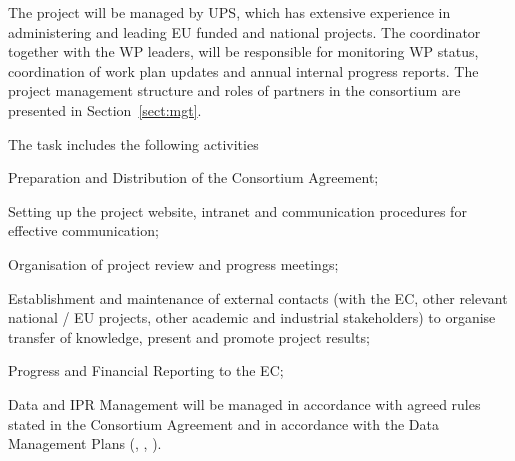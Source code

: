 \begin{workpackage}
\begin{wpobjectives}
\end{wpobjectives}

\begin{wpdescription}
The project will be managed by UPS, which has extensive experience in
administering and leading EU funded and national projects. The
coordinator together with the WP leaders, will be responsible for
monitoring WP status, coordination of work plan updates and annual
internal progress reports. The project management structure and roles
of partners in the consortium are presented in Section~\ref{sect:mgt}.
\end{wpdescription}

\begin{tasklist}
\begin{task}[title=Project and financial management,
  id=project-finance-management,lead=PS,PM=33,wphases={0-48!.2,0-3,10-12,22-24,34-36,42-48},
  partners={LL,UV,UJF,UB,UO,USH,USO,SA,UW,JU,UK,US,ZH,SR,UG,FAU,XFEL},issue=14]
  The task includes the following activities
  \begin{compactitem}
  \item Preparation and Distribution of the
    Consortium Agreement;
  \item Setting up the project website, intranet and
    communication procedures for effective communication;
  \item
    Organisation of project review and progress meetings;
  \item
    Establishment and maintenance of external contacts (with the EC,
    other relevant national / EU projects, other academic and
    industrial stakeholders) to organise transfer of knowledge,
    present and promote project results;
  \item Progress and Financial Reporting to the EC;
  \item Data and IPR Management will be managed in accordance with
    agreed rules stated in the Consortium Agreement and in accordance
    with the Data Management Plans
    (, , ).
  \end{compactitem}
\end{task}


\end{tasklist}
\end{workpackage}
